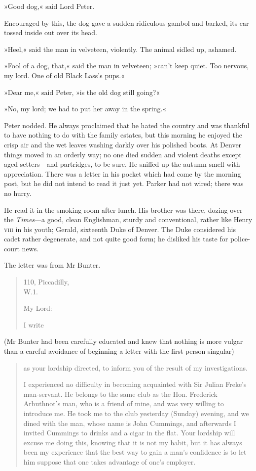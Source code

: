 »Good dog,« said Lord Peter.

Encouraged by this, the dog gave a sudden ridiculous gambol and barked, its ear tossed inside out over its head.

»Heel,« said the man in velveteen, violently. The animal sidled up, ashamed.

»Fool of a dog, that,« said the man in velveteen; »can't keep quiet. Too nervous, my lord. One of old Black Lass's pups.«

»Dear me,« said Peter, »is the old dog still going?«

»No, my lord; we had to put her away in the spring.«

Peter nodded. He always proclaimed that he hated the country and was thankful to have nothing to do with the family estates, but this morning he enjoyed the crisp air and the wet leaves washing darkly over his polished boots. At Denver things moved in an orderly way; no one died sudden and violent deaths except aged setters\allowbreak---\allowbreak and partridges, to be sure. He sniffed up the autumn smell with appreciation. There was a letter in his pocket which had come by the morning post, but he did not intend to read it just yet. Parker had not wired; there was no hurry.

He read it in the smoking-room after lunch. His brother was there, dozing over the \textit{Times}---a good, clean Englishman, sturdy and conventional, rather like Henry \textsc{viii} in his youth; Gerald, sixteenth Duke of Denver. The Duke considered his cadet rather degenerate, and not quite good form; he disliked his taste for police-court news.

The letter was from Mr Bunter.

\begin{quotation}
\begin{flushright}
110, Piccadilly,\\
W.1.
\end{flushright}

\noindent My Lord:

I write 
\end{quotation}

(Mr Bunter had been carefully educated and knew that nothing is more vulgar than a careful avoidance of beginning a letter with the first person singular) 

\begin{quotation}
as your lordship directed, to inform you of the result of my investigations.

I experienced no difficulty in becoming acquainted with Sir Julian Freke's man-servant. He belongs to the same club as the Hon. Frederick Arbuthnot's man, who is a friend of mine, and was very willing to introduce me. He took me to the club yesterday (Sunday) evening, and we dined with the man, whose name is John Cummings, and afterwards I invited Cummings to drinks and a cigar in the flat. Your lordship will excuse me doing this, knowing that it is not my habit, but it has always been my experience that the best way to gain a man's confidence is to let him suppose that one takes advantage of one's employer.
\end{quotation}

